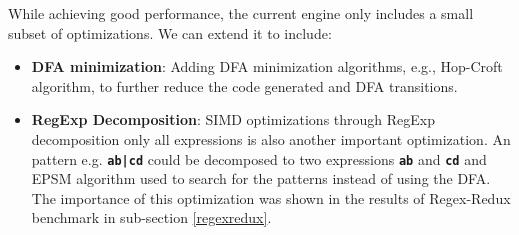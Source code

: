 While achieving good performance, the current engine only includes a small subset of optimizations. We can  extend it to include:

\begin{itemize}
    \item \textbf{DFA minimization}: Adding DFA minimization algorithms, e.g., Hop-Croft algorithm, to further reduce the code generated and DFA transitions.
    \item \textbf{RegExp Decomposition}: SIMD optimizations through RegExp decomposition only all expressions is also another important optimization. An pattern e.g. \texttt{\textbf{ab|cd}} could be decomposed to two expressions \texttt{\textbf{ab}} and \texttt{\textbf{cd}} and EPSM algorithm used to search for the patterns instead of using the DFA. The importance of this optimization was shown in the results of Regex-Redux benchmark in sub-section \ref{regexredux}.
\end{itemize}

